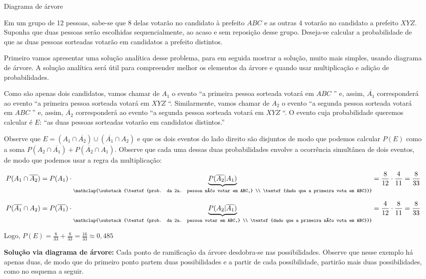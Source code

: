 \begin{example} {Diagrama de árvore}

Em um grupo de 12 pessoas, sabe-se que 8 delas votarão no candidato à prefeito  \(ABC\) e as outras 4 votarão no candidato a prefeito \(XYZ\). Suponha que duas pessoas serão escolhidas sequencialmente, ao acaso e sem reposição desse grupo. Deseja-se calcular a probabilidade de que as duas pessoas sorteadas votarão em candidatos a prefeito distintos.

Primeiro vamos apresentar uma solução analítica desse problema, para em seguida mostrar a solução, muito mais simples, usando diagrama de árvore. A solução analítica será útil para compreender melhor os elementos da árvore e quando usar multiplicação e adição de probabilidades.

Como são apenas dois candidatos, vamos chamar de \(A_1\) o evento “a primeira pessoa sorteada votará em \(ABC\) ” e, assim, \(\overline{A_1}\) corresponderá ao evento “a primeira pessoa sorteada votará em \(XYZ\) “. Similarmente, vamos chamar de \(A_2\) o evento “a segunda pessoa sorteada votará em \(ABC\) ” e, assim, \(\overline{A_2}\) corresponderá ao evento “a segunda pessoa sorteada votará em \(XYZ\) “. O evento cuja probabilidade queremos calcular é \(E\): “as duas pessoas sorteadas votarão em candidatos distintos.”

Observe que \(E=(A_1\cap \overline{A_2})\cup (\overline{A_1}\cap A_2)\)  e que os dois eventos do lado direito são disjuntos de modo que podemos calcular \(P(E)\) como a soma \(P(A_2\cap \overline{A_1})+P(\overline{A_2}\cap A_1)\). Observe que cada uma dessas duas probabilidades envolve a ocorrência simultânea de dois eventos, de modo que podemos usar a regra da multiplicação:

$$P(A_1\cap \overline{A_2})=P({A_1})\cdot \underbrace{P(\overline{A_2}|{A_1})}_{\mathclap{\substack{\textsf{prob. da 2a. pessoa não votar em ABC,} \\ \textsf{dado que a primeira vota em ABC}}}}=\frac{8}{12}\cdot\frac{4}{11}=\frac{8}{33}$$

$$P(\overline{A_1}\cap {A_2})=P(\overline{A_1})\cdot \underbrace{P({A_2}|\overline{A_1})}_{\mathclap{\substack{\textsf{prob. da 2a. pessoa votar em ABC,} \\ \textsf{dado que a primeira não vota em ABC}}}}=\frac{4}{12}\cdot\frac{8}{11}=\frac{8}{33}$$

Logo, \(\displaystyle{P(E)=\frac{8}{33}+\frac{8}{33}=\frac{16}{33}\approx 0,485}\)

\textbf{Solução via diagrama de árvore:} Cada ponto de ramificação da árvore  desdobra-se nas possibilidades. Observe que nesse exemplo há apenas duas, de modo que do primeiro ponto partem duas possibilidades e a partir de cada possibilidade, partirão mais duas possibilidades, como no esquema a seguir.
\begin{figure}[H]
\centering


\end{figure}
\end{example}
